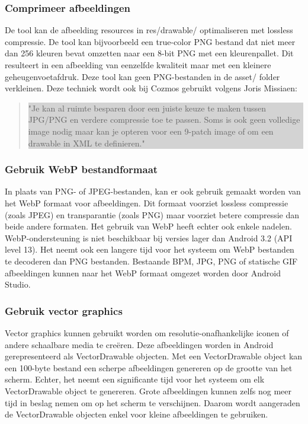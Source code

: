 \subsubsection{Comprimeer afbeeldingen }
\label{sec:compressimages}
De \cite{aapt} tool kan de afbeelding resources in res/drawable/ optimaliseren met lossless compressie. De tool kan bijvoorbeeld een true-color PNG bestand dat niet meer dan 256 kleuren bevat omzetten naar een 8-bit PNG met een kleurenpallet. Dit resulteert in een afbeelding van eenzelfde kwaliteit maar met een kleinere geheugenvoetafdruk. Deze tool kan geen PNG-bestanden in de asset/ folder verkleinen. Deze techniek wordt ook bij Cozmos gebruikt volgens Joris Missiaen: 
\begin{quote}
	\colorbox{lightgray}{\parbox{350px}{"Je kan al ruimte besparen door een juiste keuze te maken tussen JPG/PNG en verdere compressie toe te passen. Soms is ook geen volledige image nodig maar kan je opteren voor een 9-patch image of om een drawable in XML te definieren."}}
\end{quote}

\subsubsection{Gebruik WebP bestandformaat }
\label{sec:webp}
In plaats van PNG- of JPEG-bestanden, kan er ook gebruik gemaakt worden van het WebP formaat voor afbeeldingen. Dit formaat voorziet lossless compressie (zoals JPEG) en transparantie (zoals PNG) maar voorziet betere compressie dan beide andere formaten. Het gebruik van WebP heeft echter ook enkele nadelen. WebP-ondersteuning is niet beschikbaar bij versies lager dan Android 3.2 (API level 13). Het neemt ook een langere tijd voor het systeem om WebP bestanden te decoderen dan PNG bestanden. Bestaande BPM, JPG, PNG of statische GIF afbeeldingen kunnen naar het WebP formaat omgezet worden door Android Studio. 

\subsubsection{Gebruik vector graphics }
\label{sec:vectorgraphics}
Vector graphics kunnen gebruikt worden om resolutie-onafhankelijke iconen of andere schaalbare media te creëren. Deze afbeeldingen worden in Android gerepresenteerd als VectorDrawable objecten. Met een VectorDrawable object kan een 100-byte bestand een scherpe afbeeldingen genereren op de grootte van het scherm. 
Echter, het neemt een significante tijd voor het systeem om elk VectorDrawable object te genereren. Grote afbeeldingen kunnen zelfs nog meer tijd in beslag nemen om op het scherm te verschijnen. Daarom wordt aangeraden de VectorDrawable objecten enkel voor kleine afbeeldingen te gebruiken. 
